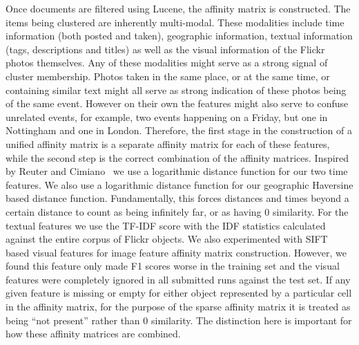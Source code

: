 \documentclass{../acm_proc_article-me11_tweaked}
\begin{document}
Once documents are filtered using Lucene, the affinity matrix is constructed. The items being clustered are inherently multi-modal. These modalities include time information (both posted and taken), geographic information, textual information (tags, descriptions and titles) as well as the visual information of the Flickr photos themselves. Any of these modalities might serve as a strong signal of cluster membership. Photos taken in the same place, or at the same time, or containing similar text might all serve as strong indication of these photos being of the same event. However on their own the features might also serve to confuse unrelated events, for example, two events happening on a Friday, but one in Nottingham and one in London. Therefore, the first stage in the construction of a unified affinity matrix is a separate affinity matrix for each of these features, while the second step is the correct combination of the affinity matrices. Inspired by Reuter and Cimiano~\cite{Reuter2012ECS23247962324824} we use a logarithmic distance function for our two time features. We also use a logarithmic distance function for our geographic Haversine based distance function. Fundamentally, this forces distances and times beyond a certain distance to count as being infinitely far, or as having 0 similarity. For the textual features we use the TF-IDF score with the IDF statistics calculated against the entire corpus of Flickr objects. We also experimented with SIFT based visual features for image feature affinity matrix construction. However, we found this feature only made F1 scores worse in the training set and the visual features were completely ignored in all submitted runs against the test set. If any given feature is missing or empty for either object represented by a particular cell in the affinity matrix, for the purpose of the sparse affinity matrix it is treated as being ``not present'' rather than 0 similarity. The distinction here is important for how these affinity matrices are combined.
\end{document}

